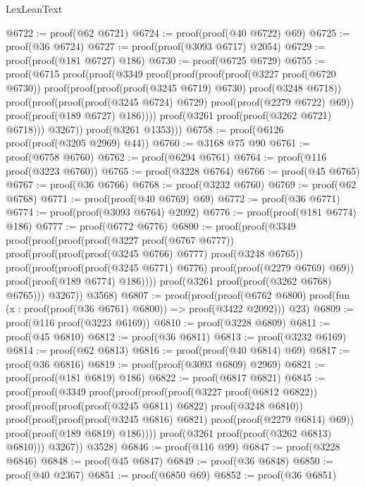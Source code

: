 \begin{lexlean}{LexLeanText}
\begin{coremodule}
@6722 := proof(@62 @6721)
@6724 := proof(proof(@40 @6722) @69)
@6725 := proof(@36 @6724)
@6727 := proof(proof(@3093 @6717) @2054)
@6729 := proof(proof(@181 @6727) @186)
@6730 := proof(@6725 @6729)
@6755 := proof(@6715
      proof(proof(@3349
            proof(proof(proof(proof(@3227 proof(@6720 @6730))
                    proof(proof(proof(proof(@3245 @6719) @6730) proof(@3248 @6718))
                        proof(proof(proof(proof(@3245 @6724) @6729) proof(proof(@2279 @6722) @69))
                            proof(proof(@189 @6727) @186))))
                  proof(@3261 proof(proof(@3262 @6721) @6718)))
                @3267))
          proof(@3261 @1353)))
@6758 := proof(@6126 proof(proof(@3205 @2969) @44))
@6760 := @3168 @75 @90
@6761 := proof(@6758 @6760)
@6762 := proof(@6294 @6761)
@6764 := proof(@116 proof(@3223 @6760))
@6765 := proof(@3228 @6764)
@6766 := proof(@45 @6765)
@6767 := proof(@36 @6766)
@6768 := proof(@3232 @6760)
@6769 := proof(@62 @6768)
@6771 := proof(proof(@40 @6769) @69)
@6772 := proof(@36 @6771)
@6774 := proof(proof(@3093 @6764) @2092)
@6776 := proof(proof(@181 @6774) @186)
@6777 := proof(@6772 @6776)
@6800 := proof(proof(@3349
        proof(proof(proof(proof(@3227 proof(@6767 @6777))
                proof(proof(proof(proof(@3245 @6766) @6777) proof(@3248 @6765))
                    proof(proof(proof(proof(@3245 @6771) @6776) proof(proof(@2279 @6769) @69))
                        proof(proof(@189 @6774) @186))))
              proof(@3261 proof(proof(@3262 @6768) @6765)))
            @3267))
      @3568)
@6807 := proof(proof(proof(@6762 @6800)
        proof(fun (x : proof(proof(@36 @6761) @6800)) => proof(@3422 @2092)))
      @23)
@6809 := proof(@116 proof(@3223 @6169))
@6810 := proof(@3228 @6809)
@6811 := proof(@45 @6810)
@6812 := proof(@36 @6811)
@6813 := proof(@3232 @6169)
@6814 := proof(@62 @6813)
@6816 := proof(proof(@40 @6814) @69)
@6817 := proof(@36 @6816)
@6819 := proof(proof(@3093 @6809) @2969)
@6821 := proof(proof(@181 @6819) @186)
@6822 := proof(@6817 @6821)
@6845 := proof(proof(@3349
        proof(proof(proof(proof(@3227 proof(@6812 @6822))
                proof(proof(proof(proof(@3245 @6811) @6822) proof(@3248 @6810))
                    proof(proof(proof(proof(@3245 @6816) @6821) proof(proof(@2279 @6814) @69))
                        proof(proof(@189 @6819) @186))))
              proof(@3261 proof(proof(@3262 @6813) @6810)))
            @3267))
      @3528)
@6846 := proof(@116 @99)
@6847 := proof(@3228 @6846)
@6848 := proof(@45 @6847)
@6849 := proof(@36 @6848)
@6850 := proof(@40 @2367)
@6851 := proof(@6850 @69)
@6852 := proof(@36 @6851)

\end{coremodule}
\end{lexlean}
